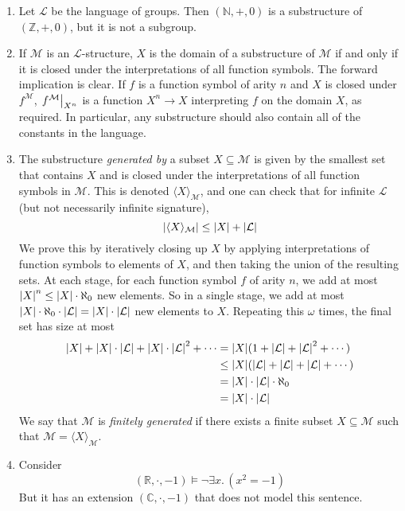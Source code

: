 \begin{example}
    \begin{enumerate}
        \item Let \( \mathcal L \) be the language of groups.
        Then \( (\mathbb N, +, 0) \) is a substructure of \( (\mathbb Z, +, 0) \), but it is not a subgroup.
        \item If \( \mathcal M \) is an \( \mathcal L \)-structure, \( X \) is the domain of a substructure of \( \mathcal M \) if and only if it is closed under the interpretations of all function symbols.
        The forward implication is clear.
        If \( f \) is a function symbol of arity \( n \) and \( X \) is closed under \( f^{\mathcal M} \), \( \eval{f^{\mathcal M}}_{X^n} \) is a function \( X^n \to X \) interpreting \( f \) on the domain \( X \), as required.
        In particular, any substructure should also contain all of the constants in the language.
        \item The substructure \emph{generated by} a subset \( X \subseteq \mathcal M \) is given by the smallest set that contains \( X \) and is closed under the interpretations of all function symbols in \( \mathcal M \).
        This is denoted \( \langle X \rangle_{\mathcal M} \), and one can check that for infinite \( \mathcal L \) (but not necessarily infinite signature),
        \[ \abs{\langle X \rangle_{\mathcal M}} \leq \abs{X} + \abs{\mathcal L} \]
        We prove this by iteratively closing up \( X \) by applying interpretations of function symbols to elements of \( X \), and then taking the union of the resulting sets.
        At each stage, for each function symbol \( f \) of arity \( n \), we add at most \( \abs{X}^n \leq \abs{X} \cdot \aleph_0 \) new elements.
        So in a single stage, we add at most \( \abs{X} \cdot \aleph_0 \cdot \abs{\mathcal L} = \abs{X} \cdot \abs{\mathcal L} \) new elements to \( X \).
        Repeating this \( \omega \) times, the final set has size at most
        \begin{align*}
            \abs{X} + \abs{X} \cdot \abs{\mathcal L} + \abs{X} \cdot \abs{\mathcal L}^2 + \cdots &= \abs{X} (1 + \abs{\mathcal L} + \abs{\mathcal L}^2 + \cdots) \\
            &\leq \abs{X} (\abs{\mathcal L} + \abs{\mathcal L} + \abs{\mathcal L} + \cdots) \\
            &= \abs{X} \cdot \abs{\mathcal L} \cdot \aleph_0 \\
            &= \abs{X} \cdot \abs{\mathcal L}
        \end{align*}
        We say that \( \mathcal M \) is \emph{finitely generated} if there exists a finite subset \( X \subseteq \mathcal M \) such that \( \mathcal M = \langle X \rangle_{\mathcal M} \).
        \item Consider
        \[ (\mathbb R, \cdot, -1) \vDash \neg \exists x.\, (x^2 = -1) \]
        But it has an extension \( (\mathbb C, \cdot, -1) \) that does not model this sentence.
    \end{enumerate}
\end{example}
